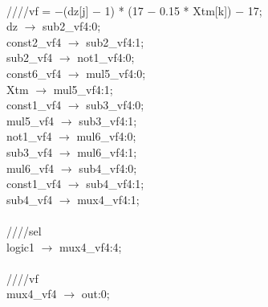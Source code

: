 {   \\
   \hspace*{2em}////vf = $-$(dz[j] $-$ 1) * (17 $-$ 0.15 * Xtm[k]) $-$ 17; \\
   \hspace*{2em}dz $\rightarrow$ sub2\_vf4:0; \\
   \hspace*{2em}const2\_vf4 $\rightarrow$ sub2\_vf4:1; \\
   \hspace*{2em}sub2\_vf4 $\rightarrow$ not1\_vf4:0; \\
   \hspace*{2em}const6\_vf4 $\rightarrow$ mul5\_vf4:0; \\
   \hspace*{2em}Xtm $\rightarrow$ mul5\_vf4:1; \\
   \hspace*{2em}const1\_vf4 $\rightarrow$ sub3\_vf4:0; \\
   \hspace*{2em}mul5\_vf4 $\rightarrow$ sub3\_vf4:1; \\
   \hspace*{2em}not1\_vf4 $\rightarrow$ mul6\_vf4:0; \\
   \hspace*{2em}sub3\_vf4 $\rightarrow$ mul6\_vf4:1; \\
   \hspace*{2em}mul6\_vf4 $\rightarrow$ sub4\_vf4:0; \\
   \hspace*{2em}const1\_vf4 $\rightarrow$ sub4\_vf4:1; \\
   \hspace*{2em}sub4\_vf4 $\rightarrow$ mux4\_vf4:1; \\
   \\
   \hspace*{2em}////sel \\
   \hspace*{2em}logic1 $\rightarrow$ mux4\_vf4:4; \\
   \\
   \hspace*{2em}////vf \\
   \hspace*{2em}mux4\_vf4 $\rightarrow$ out:0; \\
} \\
\\
\\
